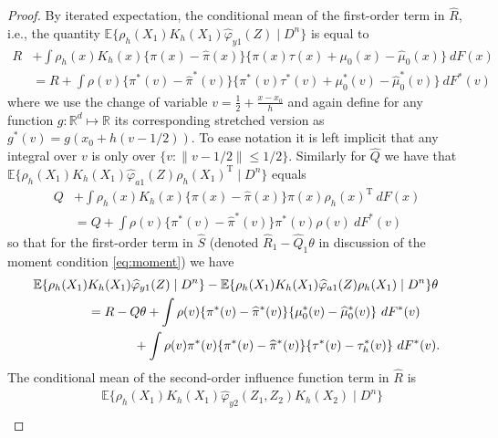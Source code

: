 \documentclass[11pt,twoside]{article}
\def\T{{ \mathrm{\scriptscriptstyle T} }}
\newcommand{\E}{\mathbb{E}}
\newcommand{\R}{\mathbb{R}}
\theoremstyle{definition}
\theoremstyle{remark}
\begin{document}
\begin{proof}
By iterated expectation, the conditional mean of the first-order term in $\widehat{R}$,  i.e., the quantity $\E\{ \rho_h(X_1)  K_h(X_1) \widehat\varphi_{y1}(Z) \mid D^n \} $ is equal to
\begin{align} 
 R& + \int  \rho_h(x) K_h(x)  \{ \pi(x) - \widehat\pi(x) \}\{ \pi(x) \tau(x) + \mu_0(x) - \widehat\mu_0(x) \}  \ dF(x) \nonumber \\
& = R + \int \rho(v) \{ \pi^*(v) - \widehat\pi^*(v) \}\{ \pi^*(v) \tau^*(v) +  \mu_0^*(v) - \widehat\mu_0^*(v) \}  \ dF^*(v) \nonumber
\end{align}
where we use the change of variable $v = \frac{1}{2} + \frac{x-x_0}{h}$ and again define for any function $g: \R^d \mapsto \R$ its corresponding stretched version as $g^*(v) = g(x_0 + h(v-1/2))$. To ease notation it is left implicit that any integral over $v$ is only over $\{v : \|v-1/2\| \leq 1/2 \}$.  Similarly for $\widehat{Q}$ we have that $\E\{ \rho_h(X_1)  K_h(X_1) \widehat\varphi_{a1}(Z) \rho_h(X_1)^\T \mid D^n \} $ equals
\begin{align} 
 Q &+ \int  \rho_h(x) K_h(x)  \{ \pi(x) - \widehat\pi(x) \} \pi(x) \rho_h(x)^\T \ dF(x) \nonumber \\
& = Q + \int \rho(v) \{ \pi^*(v) - \widehat\pi^*(v) \} \pi^*(v) \rho(v) \ dF^*(v) \nonumber
\end{align}
so that for the first-order term in $\widehat{S}$ (denoted $\widehat{R}_1-\widehat{Q}_1 \theta$ in discussion of the moment condition \eqref{eq:moment}) we have
\begin{align}
\E\{ \rho_h(X_1)  &K_h(X_1)  \widehat\varphi_{y1}(Z) \mid D^n \} - \E\{ \rho_h(X_1)  K_h(X_1) \widehat\varphi_{a1}(Z) \rho_h(X_1) \mid D^n \} \theta  \nonumber\\
&= R-Q\theta +  \int \rho(v) \{ \pi^*(v) - \widehat\pi^*(v) \}\{  \mu_0^*(v) - \widehat\mu_0^*(v) \}  \ dF^*(v) \nonumber \\
& \hspace{.5in} + \int \rho(v)\pi^*(v)  \{ \pi^*(v) - \widehat\pi^*(v) \} \{ \tau^*(v) - \tau_h^*(v) \}  \ dF^*(v) . \label{eq:firstbias}
\end{align}
The conditional mean of the second-order influence function term in $\widehat{R}$ is
\begin{align}
&\E\{   \rho_h(X_1) K_h(X_1) \widehat\varphi_{y2}(Z_1,Z_2)K_h(X_2) \mid D^n \} \label{eq:r2ndorder} \\

\end{align}
\end{proof}
\end{document}

